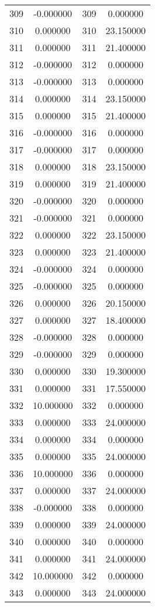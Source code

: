 \documentclass[12pt]{article}
\begin{document}
\begin{longtable}{@{}cccc@{}}
309 & -0.000000 & 309 & 0.000000 \\
310 & 0.000000 & 310 & 23.150000 \\
311 & 0.000000 & 311 & 21.400000 \\
312 & -0.000000 & 312 & 0.000000 \\
313 & -0.000000 & 313 & 0.000000 \\
314 & 0.000000 & 314 & 23.150000 \\
315 & 0.000000 & 315 & 21.400000 \\
316 & -0.000000 & 316 & 0.000000 \\
317 & -0.000000 & 317 & 0.000000 \\
318 & 0.000000 & 318 & 23.150000 \\
319 & 0.000000 & 319 & 21.400000 \\
320 & -0.000000 & 320 & 0.000000 \\
321 & -0.000000 & 321 & 0.000000 \\
322 & 0.000000 & 322 & 23.150000 \\
323 & 0.000000 & 323 & 21.400000 \\
324 & -0.000000 & 324 & 0.000000 \\
325 & -0.000000 & 325 & 0.000000 \\
326 & 0.000000 & 326 & 20.150000 \\
327 & 0.000000 & 327 & 18.400000 \\
328 & -0.000000 & 328 & 0.000000 \\
329 & -0.000000 & 329 & 0.000000 \\
330 & 0.000000 & 330 & 19.300000 \\
331 & 0.000000 & 331 & 17.550000 \\
332 & 10.000000 & 332 & 0.000000 \\
333 & 0.000000 & 333 & 24.000000 \\
334 & 0.000000 & 334 & 0.000000 \\
335 & 0.000000 & 335 & 24.000000 \\
336 & 10.000000 & 336 & 0.000000 \\
337 & 0.000000 & 337 & 24.000000 \\
338 & -0.000000 & 338 & 0.000000 \\
339 & 0.000000 & 339 & 24.000000 \\
340 & 0.000000 & 340 & 0.000000 \\
341 & 0.000000 & 341 & 24.000000 \\
342 & 10.000000 & 342 & 0.000000 \\
343 & 0.000000 & 343 & 24.000000 \\

\end{longtable}
\end{document}
